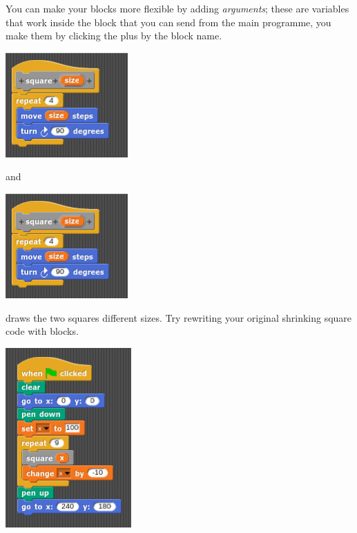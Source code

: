 \documentclass[11pt,a4paper]{scrartcl}
\begin{document}
You can make your blocks more flexible by adding \textsl{arguments};
these are variables that work inside the block that you can send from
the main programme, you make them by clicking the plus by the block
name.
\begin{center}
\includegraphics{two_squares_block_size_block.png}
\end{center}
and
\begin{center}
\includegraphics{two_squares_block_size_block.png}
\end{center}
draws the two squares different sizes.
 Try rewriting your original shrinking square code with blocks.
\begin{center}
\includegraphics{shrinking_square_block.png}
\end{center}
\end{document}
